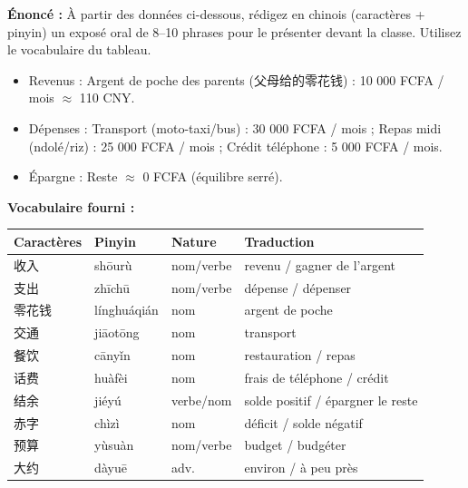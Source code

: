 \documentclass[11pt]{article}
\begin{document}
\begin{exoresolu}
\textbf{Énoncé :} À partir des données ci-dessous, rédigez en chinois (caractères + pinyin) un exposé oral de 8--10 phrases pour le présenter devant la classe. Utilisez le vocabulaire du tableau.
\begin{itemize}
    \item Revenus : Argent de poche des parents (父母给的零花钱) : 10 000 FCFA / mois $\approx$ 110 CNY.
    \item Dépenses : Transport (moto-taxi/bus) : 30 000 FCFA / mois ; Repas midi (ndolé/riz) : 25 000 FCFA / mois ; Crédit téléphone : 5 000 FCFA / mois.
    \item Épargne : Reste $\approx$ 0 FCFA (équilibre serré).
\end{itemize}
\textbf{Vocabulaire fourni :}
\begin{center}\begin{tabularx}{\linewidth}{|X|X|X|X|}\hline \rowcolor{popblueL} Caractères & Pinyin & Nature & Traduction \\ \hline
收入 & shōurù & nom/verbe & revenu / gagner de l'argent \\ \hline
支出 & zhīchū & nom/verbe & dépense / dépenser \\ \hline
零花钱 & línghuáqián & nom & argent de poche \\ \hline
交通 & jiāotōng & nom & transport \\ \hline
餐饮 & cānyǐn & nom & restauration / repas \\ \hline
话费 & huàfèi & nom & frais de téléphone / crédit \\ \hline
结余 & jiéyú & verbe/nom & solde positif / épargner le reste \\ \hline
赤字 & chìzì & nom & déficit / solde négatif \\ \hline
预算 & yùsuàn & nom/verbe & budget / budgéter \\ \hline
大约 & dàyuē & adv. & environ / à peu près \\ \hline
\end{tabularx}\end{center}


\end{exoresolu}
\end{document}
